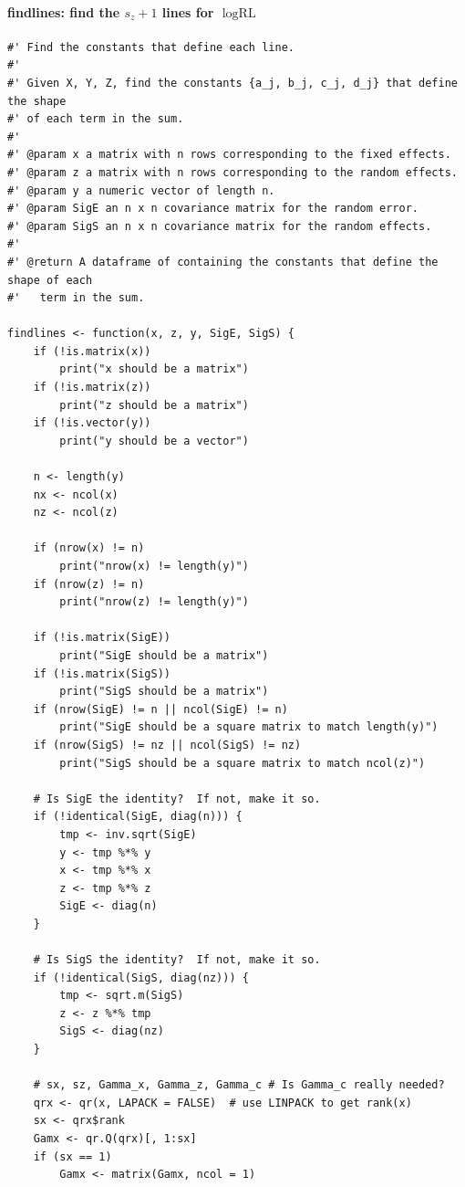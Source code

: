 \documentclass[ejs]{imsart}
\newcommand{\textcompute}{\textsf}
\newcommand{\RLorig}{\text{RL}}
\newcommand{\logRLorig}{\log\RLorig}
\begin{document}
\paragraph{\textcompute{findlines}: find the $s_z+1$ lines for $\logRLorig$}

\begin{verbatim}
#' Find the constants that define each line.
#'
#' Given X, Y, Z, find the constants {a_j, b_j, c_j, d_j} that define the shape
#' of each term in the sum.
#'
#' @param x a matrix with n rows corresponding to the fixed effects.
#' @param z a matrix with n rows corresponding to the random effects.
#' @param y a numeric vector of length n.
#' @param SigE an n x n covariance matrix for the random error.
#' @param SigS an n x n covariance matrix for the random effects.
#'
#' @return A dataframe of containing the constants that define the shape of each
#'   term in the sum.

findlines <- function(x, z, y, SigE, SigS) {
    if (!is.matrix(x))
        print("x should be a matrix")
    if (!is.matrix(z))
        print("z should be a matrix")
    if (!is.vector(y))
        print("y should be a vector")

    n <- length(y)
    nx <- ncol(x)
    nz <- ncol(z)

    if (nrow(x) != n)
        print("nrow(x) != length(y)")
    if (nrow(z) != n)
        print("nrow(z) != length(y)")

    if (!is.matrix(SigE))
        print("SigE should be a matrix")
    if (!is.matrix(SigS))
        print("SigS should be a matrix")
    if (nrow(SigE) != n || ncol(SigE) != n)
        print("SigE should be a square matrix to match length(y)")
    if (nrow(SigS) != nz || ncol(SigS) != nz)
        print("SigS should be a square matrix to match ncol(z)")

    # Is SigE the identity?  If not, make it so.
    if (!identical(SigE, diag(n))) {
        tmp <- inv.sqrt(SigE)
        y <- tmp %*% y
        x <- tmp %*% x
        z <- tmp %*% z
        SigE <- diag(n)
    }

    # Is SigS the identity?  If not, make it so.
    if (!identical(SigS, diag(nz))) {
        tmp <- sqrt.m(SigS)
        z <- z %*% tmp
        SigS <- diag(nz)
    }

    # sx, sz, Gamma_x, Gamma_z, Gamma_c # Is Gamma_c really needed?
    qrx <- qr(x, LAPACK = FALSE)  # use LINPACK to get rank(x)
    sx <- qrx$rank
    Gamx <- qr.Q(qrx)[, 1:sx]
    if (sx == 1)
        Gamx <- matrix(Gamx, ncol = 1)


\end{verbatim}
\end{document}
